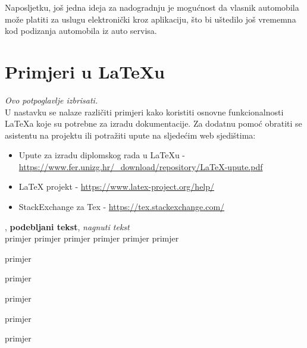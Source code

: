 		Naposljetku, još jedna ideja za nadogradnju je mogućnost da vlasnik automobila može platiti za uslugu elektronički kroz aplikaciju, što bi uštedilo još vrememna kod podizanja automobila iz auto servisa.\\
		\eject
		
		\section{Primjeri u LaTeXu}
		
		\textit{Ovo potpoglavlje izbrisati.}\\

		U nastavku se nalaze različiti primjeri kako koristiti osnovne funkcionalnosti LaTeXa koje su potrebne za izradu dokumentacije. Za dodatnu pomoć obratiti se asistentu na projektu ili potražiti upute na sljedećim web sjedištima:
		\begin{itemize}
			\item Upute za izradu diplomskog rada u LaTeXu - \url{https://www.fer.unizg.hr/_download/repository/LaTeX-upute.pdf}
			\item LaTeX projekt - \url{https://www.latex-project.org/help/}
			\item StackExchange za Tex - \url{https://tex.stackexchange.com/}\\
		
		\end{itemize} 	


		
		
		, 
		\textbf{podebljani tekst}, 
		\textit{nagnuti tekst}\\
		\normalsize primjer
		\large primjer
		\Large primjer
		\LARGE {primjer}
		\huge {primjer}
		\Huge primjer
		\normalsize
				
		\begin{packed_item}
			
			\item  primjer
			\item  primjer
			\item  primjer
			\item[] \begin{packed_enum}
				
				\item primjer
				\item primjer
			\end{packed_enum}
			
		\end{packed_item}
		
